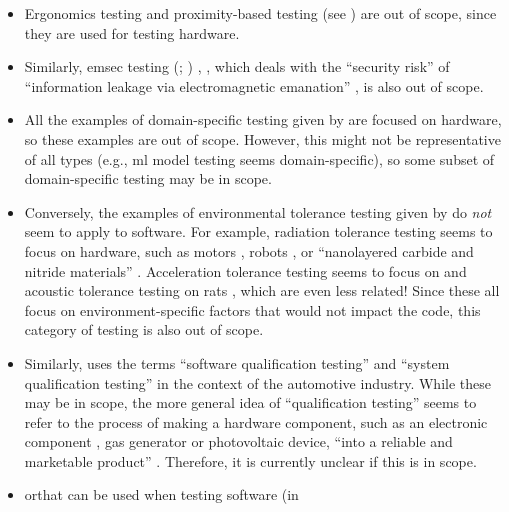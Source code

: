 \begin{itemize}
    \item Ergonomics testing and proximity-based testing (see \citealpISTQB{})
          are out of scope, since they are used for testing hardware.
    \item Similarly, \acf{emsec} testing \ifnotpaper
              (\citealp{ISO2021}; \citealp[p.~95]{ZhouEtAl2012})\else
              \cite{ISO2021}, \cite[p.~95]{ZhouEtAl2012}\fi, which deals with
          the ``security risk'' of ``information leakage via electromagnetic
          emanation'' \citep[p.~95]{ZhouEtAl2012}, is also out of scope.
          \ifnotpaper
    \item All the examples of domain-specific testing given by
          \citet[p.~26]{Firesmith2015} are focused on hardware, so these
          examples are out of scope. However, this might not be representative
          of all types (e.g., \acf{ml} model testing seems domain-specific), so
          some subset of domain-specific testing may be in scope.
    \item Conversely, the examples of environmental tolerance testing given by
          \citet[p.~56]{Firesmith2015} do \emph{not} seem to apply to software.
          For example, radiation tolerance testing seems to focus on hardware,
          such as motors \citep{MukhinEtAl2022}, robots \citep{ZhangEtAl2020},
          or ``nanolayered carbide and nitride materials''
          \citep[p.~1]{TunesEtAl2022}. Acceleration tolerance testing seems to
          focus on \accelTolTest{} and acoustic tolerance testing on rats
          \citep{HolleyEtAl1996}, which are even less related! Since these all
          focus on environment-specific factors that would not impact the code,
          this category of testing is also out of scope.
    \item Similarly, \citet{SPICE2022} uses the terms ``software
          qualification testing'' and ``system qualification testing'' in the
          context of the automotive industry. While these may be in scope, the
          more general idea of ``qualification testing'' seems to refer to the
          process of making a hardware component, such as an electronic
          component \citep{AhsanEtAl2020}, gas generator \citep{ParateEtAl2021}
          or photovoltaic device, ``into a reliable and marketable product''
          \citep[p.~1]{SuhirEtAl2013}. Therefore, it is currently unclear if
          this is in scope.
          \fi
    \item \acf{orthat} can be used when testing software \citep{Mandl1985} (in

\end{itemize}
